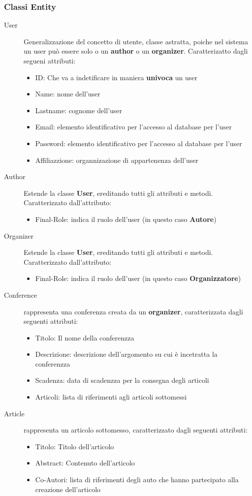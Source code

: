 \subsubsection{Classi Entity}
\begin{description}
\item [User] Generalizzazione del concetto di utente, classe astratta, poiche nel sistema un user può essere solo o un \textbf{author} o un \textbf{organizer}. Caratterizatto dagli segueni attributi:
\begin{itemize}
\item ID: Che va a indetificare in maniera \textbf{univoca} un user
\item Name: nome dell'user
\item Lastname: cognome dell'user
\item Email: elemento identificativo per l'accesso al database per l'user
\item Password:  elemento identificativo per l'accesso al database per l'user 
\item Affiliazzione: organnizazione di appartenenza dell'user
\end{itemize}
\item [Author] Estende la classe \textbf{User}, ereditando tutti gli attributi e metodi. Caratterizzato dall'attributo:
\begin{itemize}
\item Final-Role: indica il ruolo dell'user (in questo caso \textbf{Autore})
\end{itemize}
\item [Organizer] Estende la classe \textbf{User}, ereditando tutti gli attributi e metodi. Caratterizzato dall'attributo:
\begin{itemize}
\item Final-Role: indica il ruolo dell'user (in questo caso \textbf{Organizzatore}) 
\end{itemize}
\item [Conference] rappresenta una conferenza creata da un \textbf{organizer}, caratterizzata dagli seguenti attributi:
\begin{itemize}
\item Titolo: Il nome della conferenzza
\item Descrizione: descrizione dell'argomento su cui è incetratta la conferenzza
\item Scadenza: data di scadenzza per la consegna degli articoli
\item Articoli: lista di riferimenti agli articoli sottomessi
\end{itemize}
\item [Article] rappresenta un articolo sottomesso, caratterizzato dagli seguenti attributi:
\begin{itemize}
 \item Titolo: Titolo dell'articolo
\item Abstract: Contenuto dell'articolo
\item Co-Autori: lista di riferimenti degli auto che hanno partecipato alla creazione dell'articolo
\end{itemize}
\end{description}

